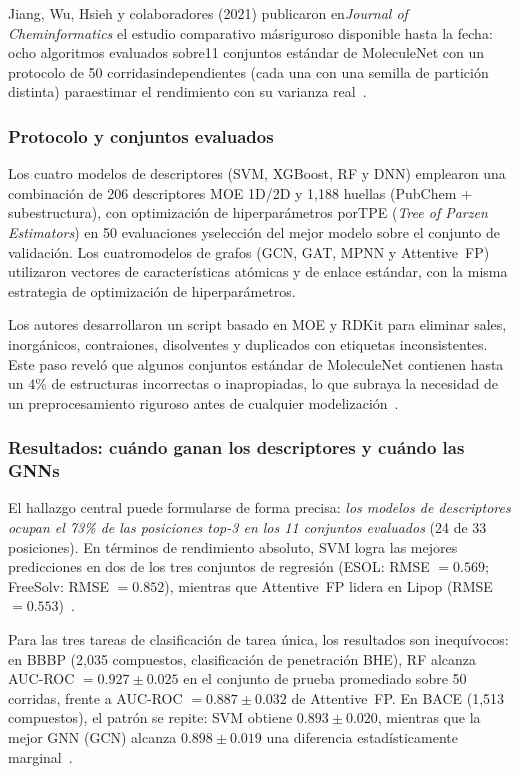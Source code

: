 Jiang, Wu, Hsieh y colaboradores (2021) publicaron en\textit{Journal of Cheminformatics} el estudio comparativo másriguroso disponible hasta la fecha: ocho algoritmos evaluados sobre11 conjuntos estándar de MoleculeNet con un protocolo de 50 corridasindependientes (cada una con una semilla de partición distinta) paraestimar el rendimiento con su varianza real~\cite{jiang_could_2021}.
 
\subsubsection{Protocolo y conjuntos evaluados}
 
Los cuatro modelos de descriptores (SVM, XGBoost, RF y DNN) emplearon una combinación de 206 descriptores MOE 1D/2D y 1{,}188 huellas (PubChem + subestructura), con optimización de hiperparámetros porTPE (\textit{Tree of Parzen Estimators}) en 50 evaluaciones yselección del mejor modelo sobre el conjunto de validación. Los cuatromodelos de grafos (GCN, GAT, MPNN y Attentive~FP) utilizaron vectores de características atómicas y de enlace estándar, con la misma estrategia de optimización de hiperparámetros.
 
Los autores desarrollaron un script basado en MOE y RDKit para eliminar sales, inorgánicos, contraiones, disolventes y duplicados con etiquetas inconsistentes. Este paso reveló que algunos conjuntos estándar de MoleculeNet contienen hasta un 4\% de estructuras incorrectas o inapropiadas, lo que subraya la necesidad de un preprocesamiento riguroso antes de cualquier modelización~\cite{jiang_could_2021}.
 
\subsubsection{Resultados: cuándo ganan los descriptores y cuándo las GNNs}
 
El hallazgo central puede formularse de forma precisa: \emph{los modelos de descriptores ocupan el 73\% de las posiciones top-3 en los 11 conjuntos evaluados} (24 de 33 posiciones). En términos de rendimiento absoluto, SVM logra las mejores predicciones en dos de los tres conjuntos de regresión (ESOL: RMSE $= 0.569$; FreeSolv: RMSE $= 0.852$), mientras que Attentive~FP lidera en Lipop (RMSE $= 0.553$)~\cite{jiang_could_2021}.
 
Para las tres tareas de clasificación de tarea única, los resultados son inequívocos: en BBBP (2,035 compuestos, clasificación de penetración BHE), RF alcanza AUC-ROC $= 0.927 \pm 0.025$ en el conjunto de prueba promediado sobre 50 corridas, frente a AUC-ROC $= 0.887 \pm 0.032$ de Attentive~FP. En BACE (1,513 compuestos), el patrón se repite: SVM obtiene $0.893 \pm 0.020$, mientras que la mejor GNN (GCN) alcanza $0.898 \pm 0.019$ una diferencia estadísticamente marginal~\cite{jiang_could_2021}.
 
